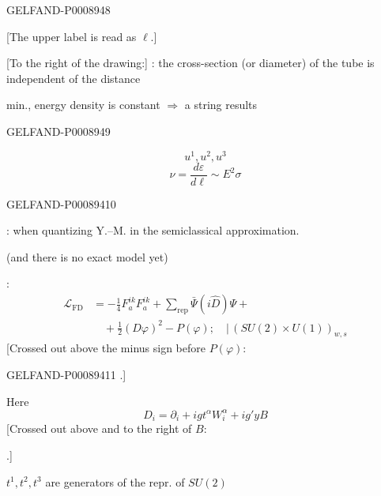 \begin{GelfandAdjacentEvidence}{GELFAND-P000894}{8}

[The upper label is read as $\ell$.]

[To the right of the drawing:] : the cross-section (or diameter) of the tube is independent of the distance

min., energy density is constant $\Rightarrow$ a string results
\end{GelfandAdjacentEvidence}
\begin{GelfandAdjacentEvidence}{GELFAND-P000894}{9}

\[
u^1,u^2,u^3
\]
\[
\nu=\frac{d\varepsilon}{d\ell}\sim E^2\sigma
\]
\end{GelfandAdjacentEvidence}
\begin{GelfandAdjacentEvidence}{GELFAND-P000894}{10}


: when quantizing Y.–M. in the semiclassical approximation.

(and there is no exact model yet)

:
\begin{equation*}
\begin{aligned}
\mathcal L_{\mathrm{FD}}&=-\frac14 F_a^{ik}F_a^{ik}
   +\sum_{\mathrm{rep}}\bar\Psi(i\hat D)\Psi+{}\\
&\quad+\frac12(D\varphi)^2-P(\varphi)\mathpunct{;}\quad
   \big|\,(SU(2)\times U(1))_{w,s}
\end{aligned}
\tag{4}
\end{equation*}
[Crossed out above the minus sign before $P(\varphi)$: 
\end{GelfandAdjacentEvidence}
\begin{GelfandAdjacentEvidence}{GELFAND-P000894}{11}
.]

Here
\begin{equation*}
D_i=\partial_i+ig t^\alpha W_i^\alpha+ig'yB \tag{5}
\end{equation*}
[Crossed out above and to the right of $B$: 
\end{GelfandAdjacentEvidence}
.]

$t^1,t^2,t^3$ are generators of the repr. of $SU(2)$


